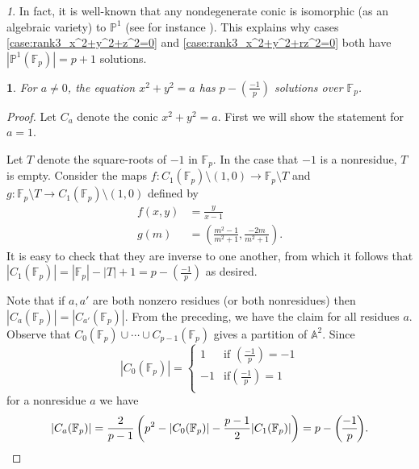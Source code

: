 \documentclass[10pt,a4paper]{amsart}
\numberwithin{equation}{section}
\numberwithin{figure}{section}
\theoremstyle{definition}
\theoremstyle{plain}
\theoremstyle{remark}
\newtheorem*{rem*}{\protect\remarkname}
\theoremstyle{plain}
\theoremstyle{definition}
\theoremstyle{plain}
\newtheorem{prop}[thm]{\protect\propositionname}
\theoremstyle{plain}
\providecommand{\propositionname}{Proposition}
\providecommand{\remarkname}{Remark}
\newcommand{\legendre}[2]{\genfrac{(}{)}{}{}{#1}{#2}}
\renewcommand{\P}{\mathbb{P}}
\newcommand{\F}{\mathbb{F}}
\begin{document}
    \begin{rem*}
      In fact, it is well-known that any nondegenerate conic is isomorphic (as an algebraic variety) to $\P^1$ (see for instance \cite[Prop.~19.3.1]{vakil}). This explains why cases \eqref{case:rank3_x^2+y^2+z^2=0} and \eqref{case:rank3_x^2+y^2+rz^2=0} both have $|\P^1(\F_p)|=p+1$ solutions.
    \end{rem*}
	
	\begin{prop}\label{prop:circle-solutions} 
		For $a \neq 0$, the equation $x^2 + y^2 = a$ has $p - \legendre{-1}{p}$ 
		solutions over $\F_p$.
	\end{prop} 
	\begin{proof} 
		Let $C_a$ denote the conic $x^2 + y^2 = a$. 
		First we will show the statement for $a=1$.
		
		Let $T$ denote the square-roots of $-1$ in $\F_p$. In the case
		that $-1$ is a nonresidue, $T$ is empty. Consider the maps $f\colon C_1(\F_p)
		\setminus (1,0) \to \F_p \setminus T$ and $g\colon \F_p
		\setminus T \to C_1(\F_p) \setminus (1,0)$ defined by 
		\begin{align*} 
		f(x,y) &= \frac{y}{x-1} \\ 
		g(m) &= \left(\frac{m^2 - 1}{m^2 + 1}, \frac{-2m}{m^2 + 1}\right).
		\end{align*} 
		It is easy to check that they are inverse to one
		another, from which it follows that $|C_1(\F_p)| = |\F_p| - |T| + 1 = p -
		\legendre{-1}{p}$ as desired.
		
		Note that if $a,a'$ are both nonzero residues (or both nonresidues)
		then $|C_a(\F_p)| = |C_{a'}(\F_p)|$. From the preceding, we have the claim for all residues
		$a$. Observe that $C_0(\F_p) \cup \cdots \cup C_{p-1}(\F_p)$ gives a partition of
		$\mathbb{A}^2$. Since 
		\[ |C_0(\F_p)| = \begin{cases}
		1 & \text{if } \legendre{-1}{p} = -1 \\
		-1 & \text{if} \legendre{-1}{p} = 1 \\
		\end{cases} \] 
		for a nonresidue $a$ we have 
		\[ |C_a(\F_p)| = \frac{2}{p-1} 
		\left(p^2 - |C_0(\F_p)| - \frac{p-1}{2}|C_1(\F_p)|\right) = 
		p - \legendre{-1}{p}. \qedhere \] 
	\end{proof}
	
\end{document}
